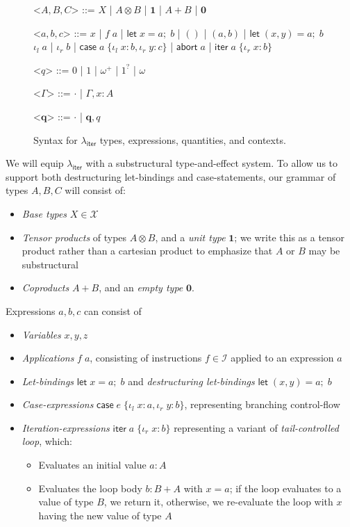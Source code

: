 \documentclass[acmsmall,screen,review]{acmart}
\newcommand{\mc}[1]{\ensuremath{\mathcal{#1}}}
\newcommand{\mb}[1]{\ensuremath{\mathbf{#1}}}
\newcommand{\ms}[1]{\ensuremath{\mathsf{#1}}}
\newcommand{\lto}{:}
\newcommand{\linl}[1]{\iota_l\;{#1}}
\newcommand{\linr}[1]{\iota_r\;{#1}}
\newcommand{\labort}[1]{\ms{abort}\;{#1}}
\newcommand{\letexpr}[3]{\ensuremath{\ms{let}\;#1 = #2;\;#3}}
\newcommand{\caseexpr}[5]{\ms{case}\;#1\;\{\linl{#2} \lto #3, \linr{#4} \lto #5\}}
\newcommand{\liter}[3]{\ms{iter}\;#1\;\{ \linr{#2} \lto #3 \}}
\newcommand{\subiterexp}{\texorpdfstring{\(\lambda_{\ms{iter}}\)}{lambda-iter}}
\newcommand{\zeroq}{0}
\newcommand{\oneq}{1}
\newcommand{\delq}{1^?}
\newcommand{\cpyq}{\omega^+}
\newcommand{\topq}{\omega}
\begin{document}
\begin{figure}
  \begin{grammar}
    <\(A, B, C\)> ::= 
    \(X\)
    \;|\; \(A \otimes B\)
    \;|\; \(\mathbf{1}\)
    \;|\; \(A + B\)
    \;|\; \(\mathbf{0}\)

    <\(a, b, c\)> ::=
    \(x\)
    \;|\; \(f\;a\)
    \;|\; \(\letexpr{x}{a}{b}\)
    \;|\; \(()\)
    \;|\; \((a, b)\)
    \;|\; \(\letexpr{(x, y)}{a}{b}\)
    \alt  \(\linl{a}\)
    \;|\; \(\linr{b}\)
    \;|\; \(\caseexpr{a}{x}{b}{y}{c}\)
    \;|\; \(\labort{a}\)
    \;|\; \(\liter{a}{x}{b}\)
    
    <\(q\)> ::= \(\zeroq\) | \(\oneq\) | \(\cpyq\) | \(\delq\) | \(\topq\)

    <\(\Gamma\)> ::= \(\cdot\) \;|\; \(\Gamma, x : A\)

    <\(\mb{q}\)> ::= \(\cdot\) \;|\; \(\mb{q}, q\)
  \end{grammar}
  \caption{Syntax for \subiterexp{} types, expressions, quantities, and contexts.} \Description{}
  \label{fig:expr-syntax}
\end{figure}

We will equip \subiterexp{} with a substructural type-and-effect system. To allow us to support both
destructuring let-bindings and case-statements, our grammar of types $A, B, C$ will consist of:
\begin{itemize}
  \item \emph{Base types} $X \in \mc{X}$
  \item \emph{Tensor products} of types $A \otimes B$, and a \emph{unit type} $\mb{1}$; we write
  this as a tensor product rather than a cartesian product to emphasize that $A$ or $B$ may be
  substructural
  \item \emph{Coproducts} $A + B$, and an \emph{empty type} $\mb{0}$.
\end{itemize}

Expressions $a, b, c$ can consist of
\begin{itemize}
  \item \emph{Variables} $x, y, z$
  \item \emph{Applications} $f\;a$, consisting of instructions $f \in \mc{I}$ applied to an
  expression $a$
  \item \emph{Let-bindings} $\letexpr{x}{a}{b}$ and \emph{destructuring let-bindings} $\letexpr{(x,
  y)}{a}{b}$
  \item \emph{Case-expressions} $\caseexpr{e}{x}{a}{y}{b}$, representing branching control-flow
  \item \emph{Iteration-expressions} $\liter{a}{x}{b}$ representing a variant of
  \emph{tail-controlled loop}, which:
  \begin{itemize}
    \item Evaluates an initial value $a : A$
    \item Evaluates the loop body $b : B + A$ with $x = a$; if the loop evaluates to a value of type
    $B$, we return it, otherwise, we re-evaluate the loop with $x$ having the new value of type $A$
  \end{itemize}
\end{itemize}
\end{document}
